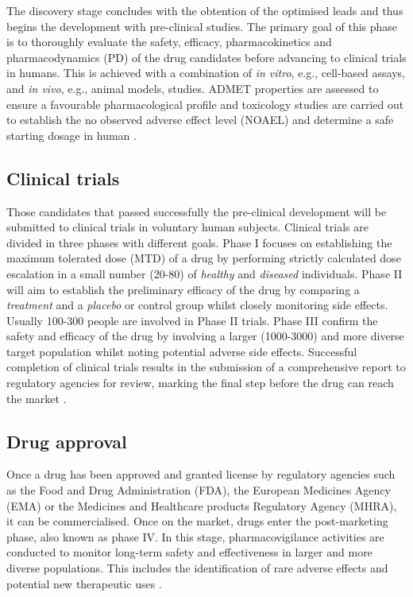 The discovery stage concludes with the obtention of the optimised leads and thus begins the development with pre-clinical studies. The primary goal of this phase is to thoroughly evaluate the safety, efficacy, pharmacokinetics and pharmacodynamics (PD) of the drug candidates before advancing to clinical trials in humans. This is achieved with a combination of \textit{in vitro}, e.g., cell-based assays, and \textit{in vivo}, e.g., animal models, studies. ADMET properties are assessed to ensure a favourable pharmacological profile and toxicology studies are carried out to establish the no observed adverse effect level (NOAEL) and determine a safe starting dosage in human \cite{SHEGOKAR_2020_PRECLINICAL}.

\subsection{Clinical trials}

Those candidates that passed successfully the pre-clinical development will be submitted to clinical trials in voluntary human subjects. Clinical trials are divided in three phases with different goals. Phase I focuses on establishing the maximum tolerated dose (MTD) of a drug by performing strictly calculated dose escalation in a small number (20-80) of \textit{healthy} and \textit{diseased} individuals. Phase II will aim to establish the preliminary efficacy of the drug by comparing a \textit{treatment} and a \textit{placebo} or control group whilst closely monitoring side effects. Usually 100-300 people are involved in Phase II trials. Phase III confirm the safety and efficacy of the drug by involving a larger (1000-3000) and more diverse target population whilst noting potential adverse side effects. Successful completion of clinical trials results in the submission of a comprehensive report to regulatory agencies for review, marking the final step before the drug can reach the market \cite{UMSCHEID_2011_TRIALS}.

\subsection{Drug approval}

Once a drug has been approved and granted license by regulatory agencies such as the Food and Drug Administration (FDA), the European Medicines Agency (EMA) or the Medicines and Healthcare products Regulatory Agency (MHRA), it can be commercialised. Once on the market, drugs enter the post-marketing phase, also known as phase IV. In this stage, pharmacovigilance activities are conducted to monitor long-term safety and effectiveness in larger and more diverse populations. This includes the identification of rare adverse effects and potential new therapeutic uses \cite{SUVARNA_2010_PHASE4}.


